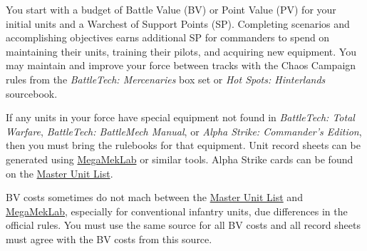 You start with a budget of Battle Value (BV) or Point Value (PV) for your initial units and a Warchest of Support Points (SP).
Completing scenarios and accomplishing objectives earns additional SP for commanders to spend on maintaining their units, training their pilots, and acquiring new equipment.
You may maintain and improve your force between tracks with the Chaos Campaign rules from the \emph{BattleTech: Mercenaries} box set or \emph{Hot Spots: Hinterlands} sourcebook.

If any units in your force have special equipment not found in \emph{BattleTech: Total Warfare}, \emph{BattleTech: BattleMech Manual}, or \emph{Alpha Strike: Commander's Edition}, then you must bring the rulebooks for that equipment.
Unit record sheets can be generated using \href{https://megamek.org}{MegaMekLab} or similar tools.
Alpha Strike cards can be found on the \href{http://www.masterunitlist.info}{Master Unit List}.

BV costs sometimes do not mach between the \href{http://www.masterunitlist.info}{Master Unit List} and \href{https://megamek.org}{MegaMekLab}, especially for conventional infantry units, due differences in the official rules.
You must use the same source for all BV costs and all record sheets must agree with the BV costs from this source.
